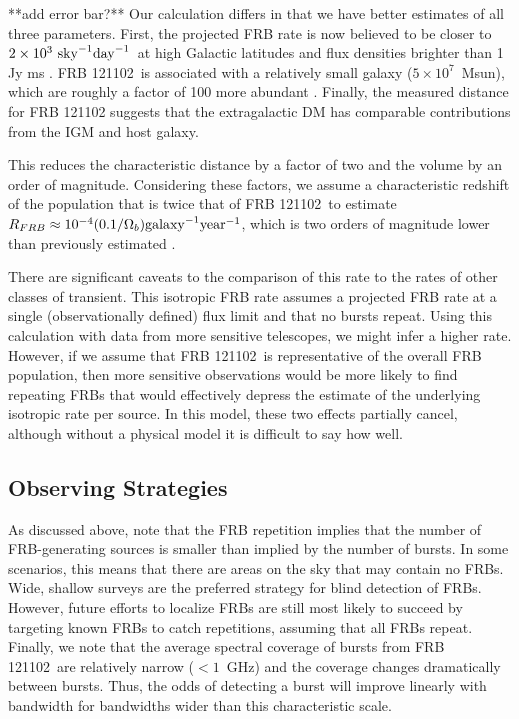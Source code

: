 \documentclass[twocolumn]{aastex61}
\newcommand{\frb}{FRB 121102}
\begin{document}
**add error bar?**
Our calculation differs in that we have better estimates of all three parameters. First, the projected FRB rate is now believed to be closer to $2\times10^3\ \rm{sky}^{-1} \rm{day}^{-1}$\ at high Galactic latitudes and flux densities brighter than 1 Jy ms \citep{2016arXiv161100458L,2016MNRAS.460L..30C, 2016MNRAS.455.2207R}. \frb\ is associated with a relatively small galaxy ($5\times10^7$\ Msun), which are roughly a factor of 100 more abundant \citep[$\Phi(M) \approx 10^{-2} \rm{Mpc}^{-3}$;][]{2007ApJ...665..265F}. Finally, the measured distance for FRB 121102 suggests that the extragalactic DM has comparable contributions from the IGM and host galaxy.

This reduces the characteristic distance by a factor of two and the volume by an order of magnitude. Considering these factors, we assume a characteristic redshift of the population that is twice that of \frb\ to estimate $R_{FRB} \approx 10^{-4} (0.1/\Omega_b) \rm{galaxy}^{-1} \rm{year}^{-1}$, which is two orders of magnitude lower than previously estimated \citep[assuming isotropic radiation;]{2013Sci...341...53T}.

There are significant caveats to the comparison of this rate to the rates of other classes of transient. This isotropic FRB rate assumes a projected FRB rate at a single (observationally defined) flux limit and that no bursts repeat. Using this calculation with data from more sensitive telescopes, we might infer a higher rate. However, if we assume that \frb\ is representative of the overall FRB population, then more sensitive observations would be more likely to find repeating FRBs that would effectively depress the estimate of the underlying isotropic rate per source. In this model, these two effects partially cancel, although without a physical model it is difficult to say how well.

\subsection{Observing Strategies}
As discussed above, \citet{2016MNRAS.458L..89C} note that the FRB repetition implies that the number of FRB-generating sources is smaller than implied by the number of bursts. In some scenarios, this means that there are areas on the sky that may contain no FRBs. Wide, shallow surveys are the preferred strategy for blind detection of FRBs. However, future efforts to localize FRBs are still most likely to succeed by targeting known FRBs to catch repetitions, assuming that all FRBs repeat. Finally, we note that the average spectral coverage of bursts from \frb\ are relatively narrow ($<1$~GHz) and the coverage changes dramatically between bursts. Thus, the odds of detecting a burst will improve linearly with bandwidth for bandwidths wider than this characteristic scale.
\end{document}

